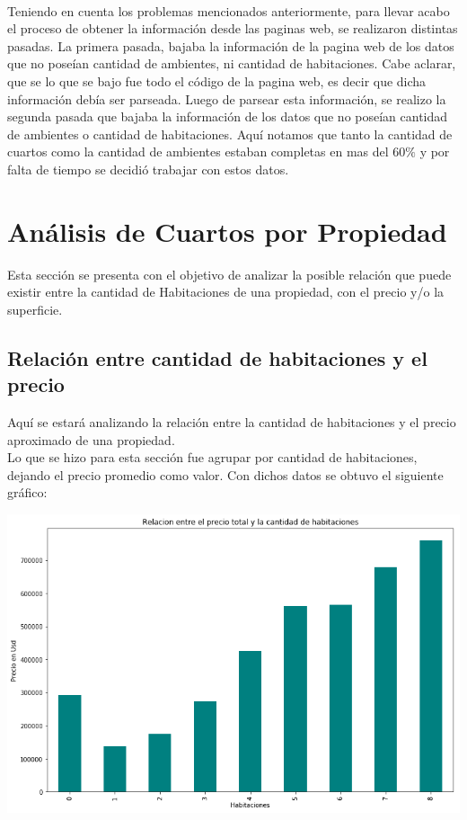 \documentclass[a4paper, 10pt]{article}
\begin{document}
		\\
		Teniendo en cuenta los problemas mencionados anteriormente, para llevar acabo el proceso de obtener la información desde las paginas web, se realizaron distintas pasadas. La primera pasada, bajaba la información de la pagina web de los datos que no poseían cantidad de ambientes, ni cantidad de habitaciones. Cabe aclarar, que se lo que se bajo fue todo el código de la pagina web, es decir que dicha información debía ser parseada. Luego de parsear esta información, se realizo la segunda pasada que bajaba la información de los datos que no poseían cantidad de ambientes o cantidad de habitaciones. Aquí notamos que tanto la cantidad de cuartos como la cantidad de ambientes estaban completas en mas del 60$\%$ y por falta de tiempo se decidió trabajar con estos datos.
		
		\section{Análisis de Cuartos por Propiedad}
		
			Esta sección se presenta con el objetivo de analizar la posible relación que puede existir entre la cantidad de Habitaciones de una propiedad, con el precio y/o la superficie. 				

			\subsection{Relación entre cantidad de habitaciones y el precio}
				Aquí se estará analizando la relación entre la cantidad de habitaciones y el precio aproximado de una propiedad.
				\\
				Lo que se hizo para esta sección fue agrupar por cantidad de habitaciones, dejando el precio promedio como valor. Con dichos datos se obtuvo el siguiente gráfico:
				
				\begin{center}    		
    				\includegraphics[width=\textwidth]{images/RelHabPrec}    				
				\end{center}
				
\end{document}
